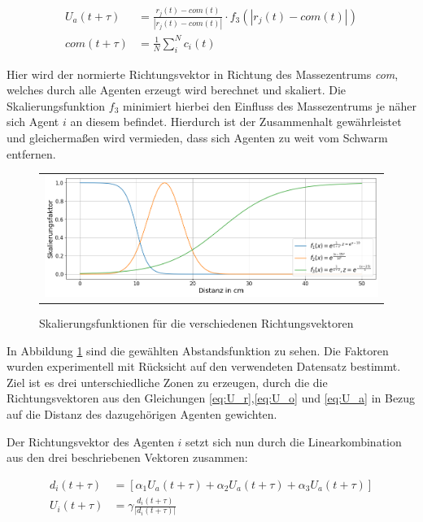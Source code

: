 \begin{subequations}
\begin{align}
U_{a}(t+\tau) &= \frac{r_{j}(t) - com(t) }{|r_{j}(t) - com(t) |} \cdot f_{3}(|r_{j}(t) - com(t)|) \label{eq:U_a}\\
com(t+\tau) &= \frac{1}{N} \sum_i^N c_i(t) 
\end{align}
\end{subequations}

Hier wird der normierte Richtungsvektor in Richtung des Massezentrums \textit{com}, welches durch alle Agenten erzeugt wird  berechnet und skaliert.
Die Skalierungsfunktion $f_{3}$ minimiert hierbei den Einfluss des Massezentrums je näher sich Agent $i$ an diesem befindet. Hierdurch ist der Zusammenhalt gewährleistet und gleichermaßen wird vermieden, dass sich Agenten zu weit vom Schwarm entfernen.


\begin{figure}[h]
\centering
\begin{tabular}{l}
\includegraphics[width=140mm]{figures/Forschung/SkalierungAbstandhalten.png} 
\end{tabular}
\caption{ Skalierungsfunktionen für die verschiedenen Richtungsvektoren \label{fig:abstandsfunktionen}}
\end{figure}

In Abbildung \ref{fig:abstandsfunktionen} sind die gewählten Abstandsfunktion zu sehen. Die Faktoren wurden experimentell mit Rücksicht auf den verwendeten Datensatz bestimmt. Ziel ist es drei unterschiedliche Zonen zu erzeugen, durch die die Richtungsvektoren aus den Gleichungen \ref{eq:U_r},\ref{eq:U_o} und \ref{eq:U_a} in Bezug auf die Distanz des dazugehörigen Agenten gewichten.


Der Richtungsvektor des Agenten $i$ setzt sich nun durch die Linearkombination aus den drei beschriebenen Vektoren zusammen:

\begin{subequations}
\begin{align}
d_i(t+\tau)  &= {[\alpha_{1} U_{a}(t+\tau) +\alpha_{2} U_{a}(t+\tau) +\alpha_{3} U_{a}(t+\tau)]}\label{eq:U_i1}\\
U_{i}(t+\tau) &= \gamma  \frac{d_i(t+\tau)}{|d_i(t+\tau)|} \label{eq:U_i2}
\end{align}
\end{subequations}

